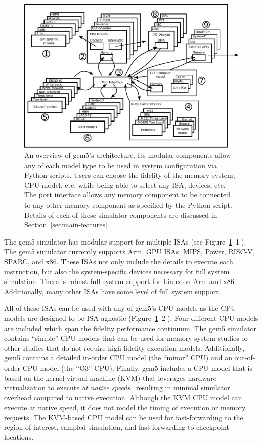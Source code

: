 \begin{figure}
  \centering
  \includegraphics[width=\textwidth]{fig/gem5-big-picture}
  \caption{An overview of gem5's architecture. Its modular components allow any of each model type to be used in system configuration via Python scripts. Users can choose the fidelity of the memory system, CPU model, etc. while being able to select any ISA, devices, etc. The port interface allows any memory component to be connected to any other memory component as specified by the Python script. Details of each of these simulator components are discussed in Section~\ref{sec:main-features}}
  \label{fig:gem5-big-picture}
\end{figure}

The gem5 simulator has modular support for multiple ISAs (see Figure~\ref{fig:gem5-big-picture}~\textcircled{1}).
The gem5 simulator currently supports Arm, GPU ISAs, MIPS, Power, RISC-V, SPARC, and x86.
These ISAs not only include the details to execute each instruction, but also the system-specific devices necessary for full system simulation.
There is robust full system support for Linux on Arm and x86.
Additionally, many other ISAs have some level of full system support.

All of these ISAs can be used with any of gem5's CPU models as the CPU models are designed to be ISA-agnostic (Figure~\ref{fig:gem5-big-picture}~\textcircled{2}).
Four different CPU models are included which span the fidelity performance continuum.
The gem5 simulator contains ``simple'' CPU models that can be used for memory system studies or other studies that do not require high-fidelity execution models.
Additionally, gem5 contains a detailed in-order CPU model (the ``minor'' CPU) and an out-of-order CPU model (the ``O3'' CPU).
Finally, gem5 includes a CPU model that is based on the kernel virtual machine (KVM) that leverages hardware virtualization to execute \emph{at native speeds}~\cite{full-speed-ahead} resulting in minimal simulator overhead compared to native execution.
Although the KVM CPU model can execute at native speed, it does not model the timing of execution or memory requests.
The KVM-based CPU model can be used for fast-forwarding to the region of interest, sampled simulation, and fast-forwarding to checkpoint locations.

